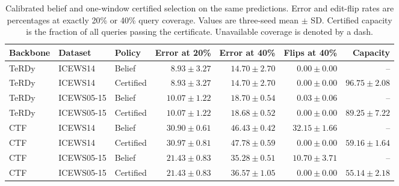 \begin{table}[tbp]\centering\small\caption{Calibrated belief and one-window certified selection on the same predictions. Error and edit-flip rates are percentages at exactly 20\% or 40\% query coverage. Values are three-seed mean $\pm$ SD. Certified capacity is the fraction of all queries passing the certificate. Unavailable coverage is denoted by a dash.}\label{tab:selection}\begin{tabular}{lllrrrr}\toprule Backbone & Dataset & Policy & Error at 20\% & Error at 40\% & Flips at 40\% & Capacity\\\midrule
TeRDy & ICEWS14 & Belief & $8.93\pm3.27$ & $14.70\pm2.70$ & $0.00\pm0.00$ & --\\
TeRDy & ICEWS14 & Certified & $8.93\pm3.27$ & $14.70\pm2.70$ & $0.00\pm0.00$ & $96.75\pm2.08$\\
TeRDy & ICEWS05-15 & Belief & $10.07\pm1.22$ & $18.70\pm0.54$ & $0.03\pm0.06$ & --\\
TeRDy & ICEWS05-15 & Certified & $10.07\pm1.22$ & $18.68\pm0.52$ & $0.00\pm0.00$ & $89.25\pm7.22$\\
CTF & ICEWS14 & Belief & $30.90\pm0.61$ & $46.43\pm0.42$ & $32.15\pm1.66$ & --\\
CTF & ICEWS14 & Certified & $30.97\pm0.81$ & $47.78\pm0.59$ & $0.00\pm0.00$ & $59.16\pm1.64$\\
CTF & ICEWS05-15 & Belief & $21.43\pm0.83$ & $35.28\pm0.51$ & $10.70\pm3.71$ & --\\
CTF & ICEWS05-15 & Certified & $21.43\pm0.83$ & $36.57\pm1.05$ & $0.00\pm0.00$ & $55.14\pm2.18$\\\bottomrule\end{tabular}\end{table}
